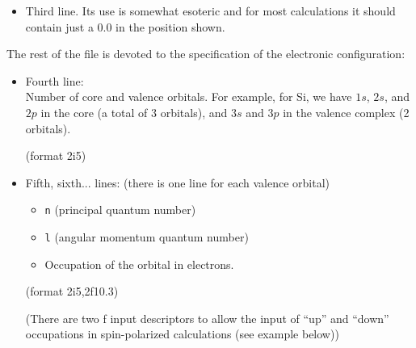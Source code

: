 \documentclass[11pt]{article}
\begin{document}
\begin{itemize}
\begin{itemize}
	\item The character {\tt r} next to {\tt ca} is a flag to perform the
          calculation relativistically, that is, solving the Dirac equation
          instead of the Schrodinger equation. 
	  The full range of options is:
	    \begin{itemize}
		\item {\tt s} : Spin-polarized calculation, non-relativistic.
		\item {\tt r}: Relativistic calculation, obviously polarized.
		\item (blank) : Non-polarized (spin ignored), non-relativistic
           		calculation.
	    \end{itemize}
	\end{itemize}
	
	(format 3x,a2,3x,a2,a1,2x)

\item Third line. Its use is somewhat esoteric and for most
		calculations it should contain just a 0.0 in the
		position shown.
\end{itemize}

The rest of the file is devoted to the specification of the electronic
configuration:

\begin{itemize} 

\item Fourth line:\\
	 Number of core and valence orbitals. For example, for Si, we
	have $1s$, $2s$, and $2p$ in the core (a total of 3 orbitals), and
	$3s$ and $3p$ in the valence complex (2 orbitals).

	(format 2i5)

\item Fifth, sixth... lines: (there is one line for each valence
orbital)
	\begin{itemize}
	\item {\tt n} (principal quantum number)
	\item {\tt l} (angular momentum quantum number)
	\item Occupation of the orbital in electrons. 
	\end{itemize}

	(format 2i5,2f10.3)

	(There are two f input descriptors to allow the input of ``up''
	and ``down'' occupations in spin-polarized calculations (see
	example below))

\end{itemize}
\end{document}
